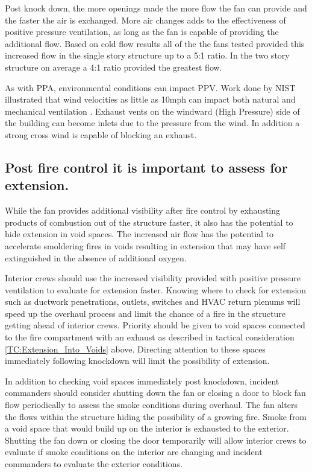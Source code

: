 \documentclass{article}
\begin{document}
Post knock down, the more openings made the more flow the fan can provide and the faster the air is exchanged. More air changes adds to the effectiveness of positive pressure ventilation, as long as the fan is capable of providing the additional flow. Based on cold flow results all of the the fans tested provided this increased flow in the single story structure up to a 5:1 ratio. In the two story structure on average a 4:1 ratio provided the greatest flow. 

As with PPA, environmental conditions can impact PPV. Work done by NIST illustrated that wind velocities as little as 10mph can impact both natural and mechanical ventilation \cite{KerberMadrzykowskiLabWindDriven}. Exhaust vents on the windward (High Pressure) side of the building can become inlets due to the pressure from the wind. In addition a strong cross wind is capable of blocking an exhaust. 

\subsection{Post fire control it is important to assess for extension.} \label{Assess_For_Extension}
While the fan provides additional visibility after fire control by exhausting products of combustion out of the structure faster, it also has the potential to hide extension in void spaces. The increased air flow has the potential to accelerate smoldering fires in voids resulting in extension that may have self extinguished in the absence of additional oxygen. 

Interior crews should use the increased visibility provided with positive pressure ventilation to evaluate for extension faster. Knowing where to check for extension such as ductwork penetrations, outlets, switches and HVAC return plenums will speed up the overhaul process and limit the chance of a fire in the structure getting ahead of interior crews. Priority should be given to void spaces connected to the fire compartment with an exhaust as described in tactical consideration \ref{TC:Extension_Into_Voids} above. Directing attention to these spaces immediately following knockdown will limit the possibility of extension.  

In addition to checking void spaces immediately post knockdown, incident commanders should consider shutting down the fan or closing a door to block fan flow periodically to assess the smoke conditions during overhaul. The fan alters the flows within the structure hiding the possibility of a growing fire. Smoke from a void space that would build up on the interior is exhausted to the exterior. Shutting the fan down or closing the door temporarily will allow interior crews to evaluate if smoke conditions on the interior are changing and incident commanders to evaluate the exterior conditions.
\end{document}
